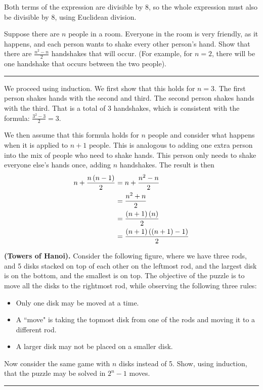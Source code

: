 \documentclass{article}
\begin{document}
Both terms of the expression are divisible by 8, so the whole expression must also be divisible by 8, using Euclidean division.

\problem{}
Suppose there are $n$ people in a room.
Everyone in the room is very friendly, as it happens, and each person wants to shake every other person's hand.
Show that there are $\frac{n^2-n}{2}$ handshakes that will occur.
(For example, for $n=2$, there will be one handshake that occurs between the two people).
\hrule

We proceed using induction.
We first show that this holds for $n=3$.
The first person shakes hands with the second and third.
The second person shakes hands with the third.
That is a total of $3$ handshakes, which is consistent with the formula: $\frac{3^2 - 3}{2} = 3$.

We then assume that this formula holds for $n$ people and consider what happens when it is applied to $n+1$ people.
This is analogous to adding one extra person into the mix of people who need to shake hands.
This person only needs to shake everyone else's hands once, adding $n$ handshakes.
The result is then
\begin{align*}
  n + \frac{n \left (n-1 \right)}{2} &= n + \frac{n^2 - n}{2} \\
                             &= \frac{n^2 + n}{2} \\
                             &= \frac{\left (n+1 \right) \left (n \right)}{2} \\
                             &= \frac{\left (n+1 \right) \left (\left (n+1 \right)-1 \right)}{2}
\end{align*}

\problem
\textbf{(Towers of Hanoi).} Consider the following figure, where we have three rods, and 5 disks stacked on top of each other on the leftmost rod, and the largest disk is on the bottom, and the smallest is on top.
The objective of the puzzle is to move all the disks to the rightmost rod, while observing the following three rules:
\begin{itemize}
\item Only one disk may be moved at a time. 
\item A ``move" is taking the topmost disk from one of the rods and moving it to a different rod.
\item A larger disk may not be placed on a smaller disk. 
\end{itemize}
Now consider the same game with $n$ disks instead of 5. Show, using induction, that the puzzle may be solved in $2^n-1$ moves.
\hrule
\end{document}
